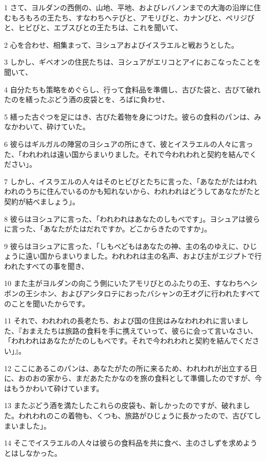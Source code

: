\par 1 さて、ヨルダンの西側の、山地、平地、およびレバノンまでの大海の沿岸に住むもろもろの王たち、すなわちヘテびと、アモリびと、カナンびと、ペリジびと、ヒビびと、エブスびとの王たちは、これを聞いて、
\par 2 心を合わせ、相集まって、ヨシュアおよびイスラエルと戦おうとした。
\par 3 しかし、ギベオンの住民たちは、ヨシュアがエリコとアイにおこなったことを聞いて、
\par 4 自分たちも策略をめぐらし、行って食料品を準備し、古びた袋と、古びて破れたのを繕ったぶどう酒の皮袋とを、ろばに負わせ、
\par 5 繕った古ぐつを足にはき、古びた着物を身につけた。彼らの食料のパンは、みなかわいて、砕けていた。
\par 6 彼らはギルガルの陣営のヨシュアの所にきて、彼とイスラエルの人々に言った、「われわれは遠い国からまいりました。それで今われわれと契約を結んでください」。
\par 7 しかし、イスラエルの人々はそのヒビびとたちに言った、「あなたがたはわれわれのうちに住んでいるのかも知れないから、われわれはどうしてあなたがたと契約が結べましょう」。
\par 8 彼らはヨシュアに言った、「われわれはあなたのしもべです」。ヨシュアは彼らに言った、「あなたがたはだれですか。どこからきたのですか」。
\par 9 彼らはヨシュアに言った、「しもべどもはあなたの神、主の名のゆえに、ひじょうに遠い国からまいりました。われわれは主の名声、および主がエジプトで行われたすべての事を聞き、
\par 10 また主がヨルダンの向こう側にいたアモリびとのふたりの王、すなわちヘシボンの王シホン、およびアシタロテにおったバシャンの王オグに行われたすべてのことを聞いたからです。
\par 11 それで、われわれの長老たち、および国の住民はみなわれわれに言いました、『おまえたちは旅路の食料を手に携えていって、彼らに会って言いなさい、「われわれはあなたがたのしもべです。それで今われわれと契約を結んでください」』。
\par 12 ここにあるこのパンは、あなたがたの所に来るため、われわれが出立する日に、おのおの家から、まだあたたかなのを旅の食料として準備したのですが、今はもうかわいて砕けています。
\par 13 またぶどう酒を満たしたこれらの皮袋も、新しかったのですが、破れました。われわれのこの着物も、くつも、旅路がひじょうに長かったので、古びてしまいました」。
\par 14 そこでイスラエルの人々は彼らの食料品を共に食べ、主のさしずを求めようとはしなかった。
